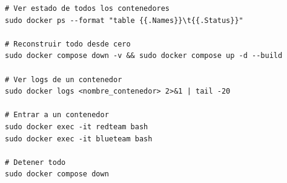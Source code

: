 \documentclass[12pt,a4paper]{article}
\begin{document}
\begin{lstlisting}
# Ver estado de todos los contenedores
sudo docker ps --format "table {{.Names}}\t{{.Status}}"

# Reconstruir todo desde cero
sudo docker compose down -v && sudo docker compose up -d --build

# Ver logs de un contenedor
sudo docker logs <nombre_contenedor> 2>&1 | tail -20

# Entrar a un contenedor
sudo docker exec -it redteam bash
sudo docker exec -it blueteam bash

# Detener todo
sudo docker compose down
\end{lstlisting}
\end{document}
